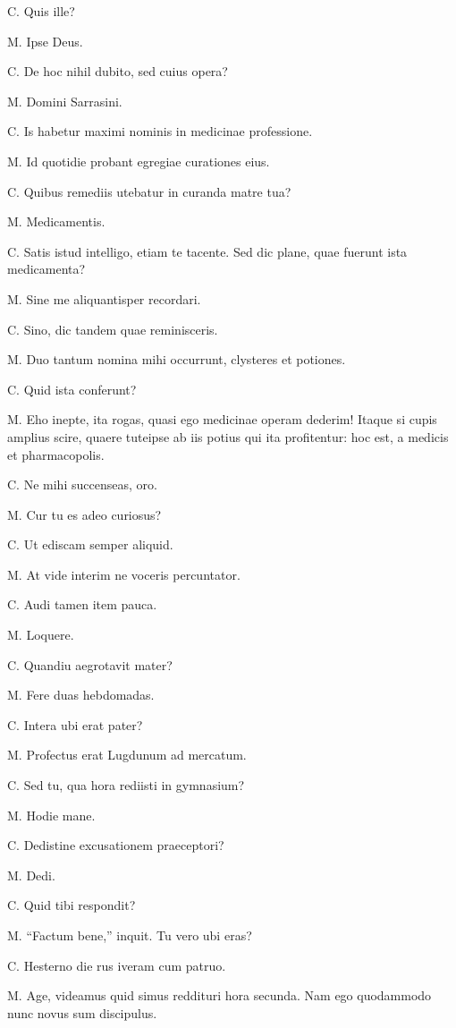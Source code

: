 \documentclass{article}
\begin{document}
C. Quis ille?

M. Ipse Deus. 

C. De hoc nihil dubito, sed cuius opera?

M. Domini Sarrasini. 

C. Is habetur maximi nominis in medicinae professione. 

M. Id quotidie probant egregiae curationes eius. 

C. Quibus remediis utebatur in curanda matre tua?

M. Medicamentis. 

C. Satis istud intelligo, etiam te tacente. Sed dic plane, quae fuerunt ista medicamenta?

M. Sine me aliquantisper recordari. 

C. Sino, dic tandem quae reminisceris. 

M. Duo tantum nomina mihi occurrunt, clysteres et potiones. 

C. Quid ista conferunt?

M. Eho inepte, ita rogas, quasi ego medicinae operam dederim! Itaque si cupis amplius scire, quaere tuteipse ab iis potius qui ita profitentur: hoc est, a medicis et pharmacopolis. 

C. Ne mihi succenseas, oro. 

M. Cur tu es adeo curiosus?

C. Ut ediscam semper aliquid. 

M. At vide interim ne voceris percuntator. 

C. Audi tamen item pauca. 

M. Loquere. 

C. Quandiu aegrotavit mater?

M. Fere duas hebdomadas. 

C. Intera ubi erat pater?

M. Profectus erat Lugdunum ad mercatum. 

C. Sed tu, qua hora rediisti in gymnasium?

M. Hodie mane. 

C. Dedistine excusationem praeceptori?

M. Dedi. 

C. Quid tibi respondit?

M. ``Factum bene,'' inquit. Tu vero ubi eras?

C. Hesterno die rus iveram cum patruo. 

M. Age, videamus quid simus reddituri hora secunda. Nam ego quodammodo nunc novus sum discipulus.
\end{document}
